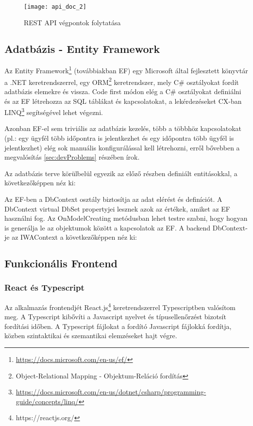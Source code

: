 \begin{figure}[H]
	\centering
	\texttt{[image: api\_doc\_2]}
	\caption{REST API végpontok folytatása}
	\label{fig:apiDoc2}
\end{figure}

\subsection{Adatbázis - Entity Framework}
Az Entity Framework\footnote{\url{https://docs.microsoft.com/en-us/ef/}} (továbbiakban EF) egy Microsoft által fejlesztett könyvtár a .NET keretrendszerrel, egy ORM\footnote{Object-Relational Mapping - Objektum-Reláció fordítás} keretrendszer, mely C\# osztályokat fordít adatbázis elemekre és vissza. Code first módon elég a C\# osztályokat definiálni és az EF létrehozza az SQL táblákat és kapcsolatokat, a lekérdezéseket CX-ban LINQ\footnote{\url{https://docs.microsoft.com/en-us/dotnet/csharp/programming-guide/concepts/linq/}} segítségével lehet végezni.

Azonban EF-el sem triviális az adatbázis kezelés, több a többhöz kapcsolatokat (pl.: egy ügyfél több időpontra is jelentkezhet és egy időpontra több ügyfél is jelentkezhet) elég sok manuális konfigurálással kell létrehozni, erről bővebben a megvalósítás \ref{sec:devProblems} részében írok.

Az adatbázis terve körülbelül egyezik az előző részben definiált entitásokkal, a következőképpen néz ki:


Az EF-ben a DbContext osztály biztosítja az adat elérést és definíciót. A DbContext virtual DbSet propertyjei lesznek azok az értékek, amiket az EF használni fog. Az OnModelCreating metódusban lehet testre szabni, hogy hogyan is generálja le az objektumok között a kapcsolatok az EF. A backend DbContext-je az IWAContext a következőképpen néz ki:



\subsection{Funkcionális Frontend}
\subsubsection{React és Typescript}

Az alkalmazás frontendjét React.js\footnote{https://reactjs.org/} keretrendszerrel Typescriptben valósítom meg. A Typescript kibővíti a Javascript nyelvet és típusellenőrzést bizotsít fordítási időben. A Typescript fájlokat a fordító Javascript fájlokká fordítja, közben szintaktikai és szemantikai elemzéseket hajt végre.

